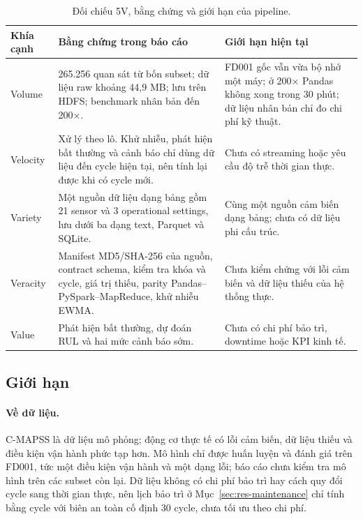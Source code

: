 \begin{table}[H]
\centering
\caption[Phạm vi Big Data theo 5V]{Đối chiếu 5V, bằng chứng và giới hạn của pipeline.}
\label{tab:big-data-5v}
\small
\begin{tabularx}{\linewidth}{L{2.0cm}L{6.0cm}X}
\toprule
Khía cạnh & Bằng chứng trong báo cáo & Giới hạn hiện tại \\\midrule
Volume & 265.256 quan sát từ bốn subset; dữ liệu raw khoảng 44,9 MB; lưu trên HDFS; benchmark nhân bản đến 200×. & FD001 gốc vẫn vừa bộ nhớ một máy; ở 200× Pandas không xong trong 30 phút; dữ liệu nhân bản chỉ đo chi phí kỹ thuật. \\
Velocity & Xử lý theo lô. Khử nhiễu, phát hiện bất thường và cảnh báo chỉ dùng dữ liệu đến cycle hiện tại, nên tính lại được khi có cycle mới. & Chưa có streaming hoặc yêu cầu độ trễ thời gian thực. \\
Variety & Một nguồn dữ liệu dạng bảng gồm 21 sensor và 3 operational settings, lưu dưới ba dạng text, Parquet và SQLite. & Cùng một nguồn cảm biến dạng bảng; chưa có dữ liệu phi cấu trúc. \\
Veracity & Manifest MD5/SHA-256 của nguồn, contract schema, kiểm tra khóa và cycle, giá trị thiếu, parity Pandas--PySpark--MapReduce, khử nhiễu EWMA. & Chưa kiểm chứng với lỗi cảm biến và dữ liệu thiếu của hệ thống thực. \\
Value & Phát hiện bất thường, dự đoán RUL và hai mức cảnh báo sớm. & Chưa có chi phí bảo trì, downtime hoặc KPI kinh tế. \\
\bottomrule
\end{tabularx}
\end{table}

\subsection{Giới hạn}
\label{sec:limitations}
\paragraph{Về dữ liệu.} C-MAPSS là dữ liệu mô phỏng; động cơ thực tế có lỗi cảm
biến, dữ liệu thiếu và điều kiện vận hành phức tạp hơn. Mô hình chỉ được huấn luyện
và đánh giá trên FD001, tức một điều kiện vận hành và một dạng lỗi; báo cáo chưa kiểm
tra mô hình trên các subset còn lại. Dữ liệu không có chi phí
bảo trì hay cách quy đổi cycle sang thời gian thực, nên lịch bảo trì ở
Mục~\ref{sec:res-maintenance} chỉ tính bằng cycle với biên an toàn cố định 30 cycle,
chưa tối ưu theo chi phí.

